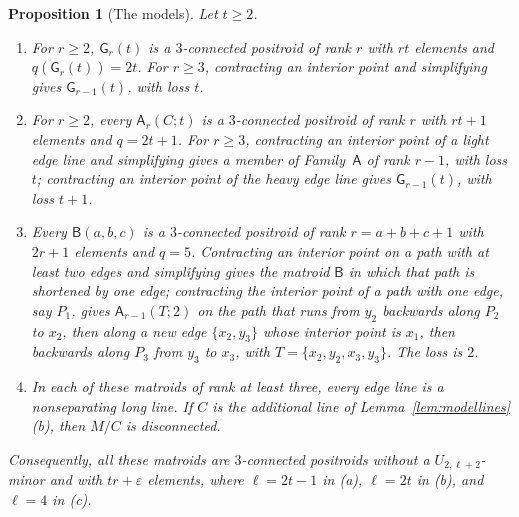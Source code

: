 \documentclass[11pt]{amsart}
\newtheorem{proposition}[theorem]{Proposition}
\theoremstyle{definition}
\theoremstyle{remark}
\numberwithin{equation}{section}
\newcommand{\GW}{\mathsf{G}}
\newcommand{\FA}{\mathsf{A}}
\newcommand{\FB}{\mathsf{B}}
\begin{document}
\begin{proposition}[The models]\label{prop:sufficiency}
Let $t\ge2$.
\begin{enumerate}[label=\textup{(\alph*)}]
\item For $r\ge2$, $\GW_r(t)$ is a $3$-connected positroid of rank $r$ with $rt$ elements and $q(\GW_r(t))=2t$. For $r\ge3$, contracting an interior point and simplifying gives $\GW_{r-1}(t)$, with loss $t$.
\item For $r\ge2$, every $\FA_r(C;t)$ is a $3$-connected positroid of rank $r$ with $rt+1$ elements and $q=2t+1$. For $r\ge3$, contracting an interior point of a light edge line and simplifying gives a member of Family~$\FA$ of rank $r-1$, with loss $t$; contracting an interior point of the heavy edge line gives $\GW_{r-1}(t)$, with loss $t+1$.
\item Every $\FB(a,b,c)$ is a $3$-connected positroid of rank $r=a+b+c+1$ with $2r+1$ elements and $q=5$. Contracting an interior point on a path with at least two edges and simplifying gives the matroid $\FB$ in which that path is shortened by one edge; contracting the interior point of a path with one edge, say $P_1$, gives $\FA_{r-1}(T;2)$ on the path that runs from $y_2$ backwards along $P_2$ to $x_2$, then along a new edge $\{x_2,y_3\}$ whose interior point is $x_1$, then backwards along $P_3$ from $y_3$ to $x_3$, with $T=\{x_2,y_2,x_3,y_3\}$. The loss is $2$.
\item In each of these matroids of rank at least three, every edge line is a nonseparating long line. If $C$ is the additional line of Lemma~\textup{\ref{lem:modellines}(b)}, then $M/C$ is disconnected.
\end{enumerate}
Consequently, all these matroids are $3$-connected positroids without a $U_{2,\ell+2}$-minor and with $tr+\varepsilon$ elements, where $\ell=2t-1$ in \textup{(a)}, $\ell=2t$ in \textup{(b)}, and $\ell=4$ in \textup{(c)}.
\end{proposition}
\end{document}

